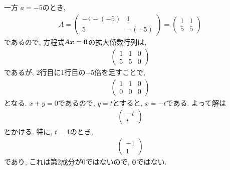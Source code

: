 \begin{checkanswer}
  一方
  $a=-5$のとき,
  \begin{align*}
    A=\begin{pmatrix}-4-(-5)&1\\5&-(-5)\end{pmatrix}
    =\begin{pmatrix}1&1\\5&5\end{pmatrix}
  \end{align*}
  であるので, 方程式$A\boldsymbol{x}=\boldsymbol{0}$の拡大係数行列は,
  \begin{align*}
    \begin{pmatrix}1&1&0\\5&5&0\end{pmatrix}
  \end{align*}
  であるが, 2行目に1行目の$-5$倍を足すことで,
  \begin{align*}
    \begin{pmatrix}1&1&0\\0&0&0\end{pmatrix}
  \end{align*}
  となる.
  $x+y=0$であるので, $y=t$とすると, $x=-t$である.
  よって解は
  \begin{align*}
    \begin{pmatrix}-t\\t\end{pmatrix}
  \end{align*}
  とかける. 特に, $t=1$のとき,
  \begin{align*}
    \begin{pmatrix}-1\\1\end{pmatrix}
  \end{align*}
  であり, これは第2成分が$0$ではないので, $\boldsymbol{0}$ではない.  
\end{checkanswer}




